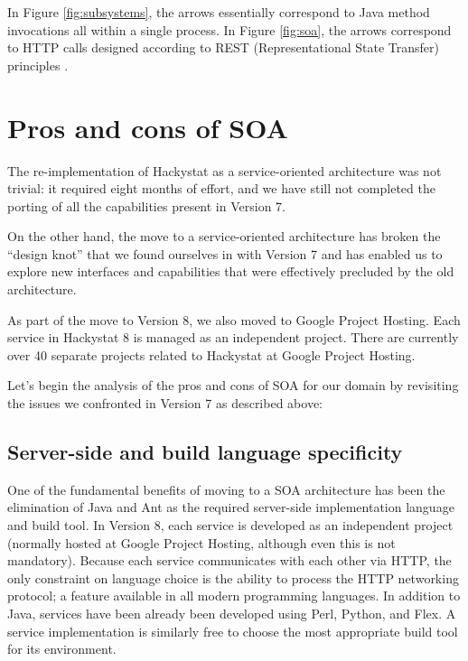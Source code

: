 \documentclass[conference,compsoc]{IEEEtran}
\begin{document}
In Figure \ref{fig:subsystems}, the arrows essentially correspond to Java
method invocations all within a single process.  In Figure \ref{fig:soa},
the arrows correspond to HTTP calls designed according to REST
(Representational State Transfer) principles \cite{Fielding02}.

\section{Pros and cons of SOA}
\label{sec:discussion}

The re-implementation of Hackystat as a service-oriented architecture was
not trivial: it required eight months of effort, and we have still not
completed the porting of all the capabilities present in Version 7.  

On the other hand, the move to a service-oriented architecture has broken
the ``design knot'' that we found ourselves in with Version 7 and has
enabled us to explore new interfaces and capabilities that were effectively
precluded by the old architecture.  

As part of the move to Version 8, we also moved to Google Project Hosting.
Each service in Hackystat 8 is managed as an independent project.  There
are currently over 40 separate projects related to Hackystat at Google
Project Hosting. 

Let's begin the analysis of the pros
and cons of SOA for our domain by revisiting the issues we confronted in
Version 7 as described above:

\subsection{Server-side and build language specificity}

One of the fundamental benefits of moving to a SOA architecture has been
the elimination of Java and Ant as the required server-side implementation
language and build tool.  In Version 8, each service is developed as an
independent project (normally hosted at Google Project Hosting, although
even this is not mandatory).  Because each service communicates with each
other via HTTP, the only constraint on language choice is the ability to
process the HTTP networking protocol; a feature available in all modern
programming languages.  In addition to Java, services have been already
been developed using Perl, Python, and Flex.  A service implementation is
similarly free to choose the most appropriate build tool for its
environment.
\end{document}
